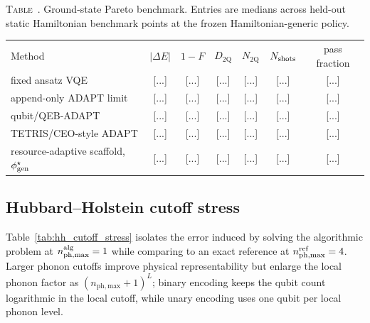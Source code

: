 \documentclass[
  reprint,
  amsmath,
  amssymb,
  aps,
  pra,
  nofootinbib,
  superscriptaddress,
  floatfix
]{revtex4-2}
\newcommand{\placeholder}[1]{\textcolor{red!70!black}{\ifmmode\left[#1\right]\else\textsf{[#1]}\fi}}
\newcommand{\phmax}{n_{\mathrm{ph,max}}}
\newcommand{\twq}{\mathrm{2Q}}
\newcommand{\inlinetablecaption}[2]{%
  \refstepcounter{table}\label{#1}%
  \noindent\textsc{Table~\thetable.} #2\par\vspace{0.6ex}%
}
\begin{document}
\begin{widetext}
\inlinetablecaption{tab:static_claims}{Ground-state Pareto benchmark. Entries are medians across held-out static Hamiltonian benchmark points at the frozen Hamiltonian-generic policy.}
\begin{center}
\begin{ruledtabular}
\begin{tabular}{lcccccc}
Method & $|\Delta E|$ & $1-F$ & $D_{\twq}$ & $N_{\twq}$ & $N_{\rm shots}$ & pass fraction \\
\colrule
fixed ansatz VQE & \placeholder{...} & \placeholder{...} & \placeholder{...} & \placeholder{...} & \placeholder{...} & \placeholder{...} \\
append-only ADAPT limit & \placeholder{...} & \placeholder{...} & \placeholder{...} & \placeholder{...} & \placeholder{...} & \placeholder{...} \\
qubit/QEB-ADAPT & \placeholder{...} & \placeholder{...} & \placeholder{...} & \placeholder{...} & \placeholder{...} & \placeholder{...} \\
TETRIS/CEO-style ADAPT & \placeholder{...} & \placeholder{...} & \placeholder{...} & \placeholder{...} & \placeholder{...} & \placeholder{...} \\
resource-adaptive scaffold, $\phi_{\rm gen}^{\star}$ & \placeholder{...} & \placeholder{...} & \placeholder{...} & \placeholder{...} & \placeholder{...} & \placeholder{...} \\
\end{tabular}
\end{ruledtabular}
\end{center}
\end{widetext}

\subsection{Hubbard--Holstein cutoff stress}

Table~\ref{tab:hh_cutoff_stress} isolates the error induced by solving the algorithmic problem at $\phmax^{\rm alg}=1$ while comparing to an exact reference at $\phmax^{\rm ref}=4$. Larger phonon cutoffs improve physical representability but enlarge the local phonon factor as $(\phmax+1)^L$; binary encoding keeps the qubit count logarithmic in the local cutoff, while unary encoding uses one qubit per local phonon level.
\end{document}
